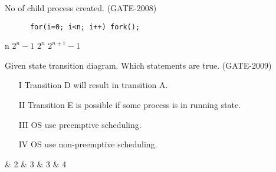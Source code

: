 \vspace{0.08in}


\begin{minipage}{\linewidth}

  \question  No of child process created. (GATE-2008)

  \begin{lstlisting}
      for(i=0; i<n; i++) fork();
  \end{lstlisting}

  \begin{choices}
    \choice n
    \choice \(2^n -1 \)
    \choice \(2^n \)
    \choice \(2^{n+1} -1 \)


  \end{choices}

\end{minipage}

\vspace{0.08in}


\begin{minipage}{\linewidth}

  \question  Given state transition diagram. Which statements are true. (GATE-2009)

  \begin{enumerate}
      \item[I] Transition D will result in transition A.
      \item[II] Transition E is possible if some process is in running state.
      \item[III] OS use preemptive scheduling.
      \item[IV] OS use non-preemptive scheduling.
   \end{enumerate}

  \begin{choices}
     \& 2
     \& 3
     \& 3
     \& 4
  \end{choices}

\end{minipage}

\vspace{0.08in}


